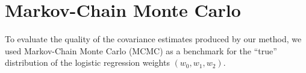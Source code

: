 
\section{Markov-Chain Monte Carlo}\label{sec:mcmc}

To evaluate the quality of the covariance estimates produced by our method, we used Markov-Chain Monte Carlo (MCMC) as a benchmark for the ``true'' distribution of the logistic regression weights $(w_0, w_1, w_2)$.  

